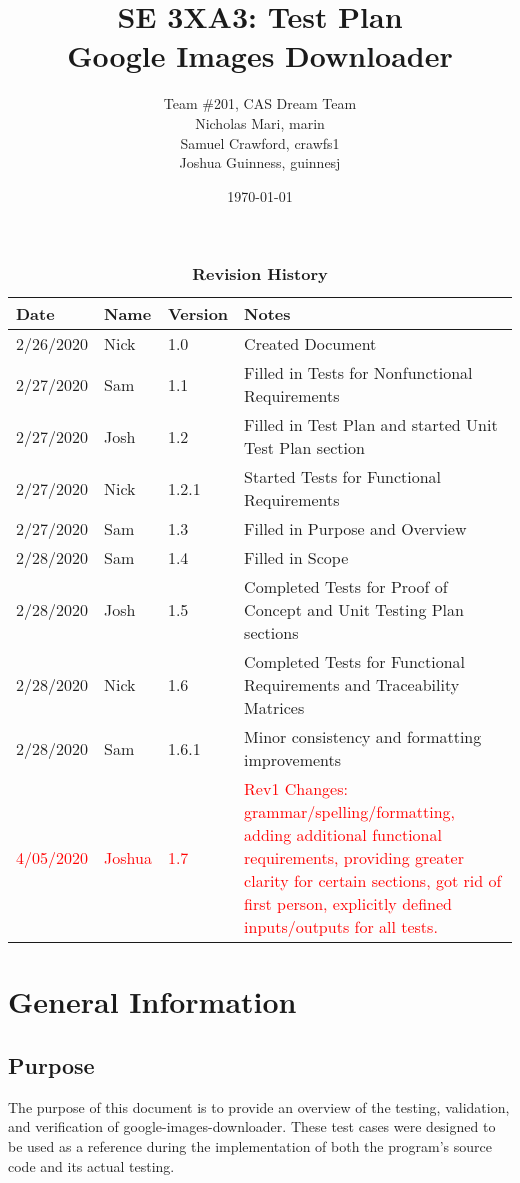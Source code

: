 \documentclass[12pt, titlepage]{article}
\title{SE 3XA3: Test Plan\\Google Images Downloader}
\author{Team \#201, CAS Dream Team
		\\ Nicholas Mari, marin
		\\ Samuel Crawford, crawfs1
		\\ Joshua Guinness, guinnesj
}
\date{\today}
\begin{document}
\maketitle

\tableofcontents
\listoftables

\begin{table}[!b]
\begin{tabularx}{\textwidth}{lllp{7.5cm}}
\toprule {\bf Date} & {\bf Name} & {\bf Version} & {\bf Notes}\\
\midrule
2/26/2020 & Nick & 1.0 & Created Document\\
2/27/2020 & Sam & 1.1 & Filled in Tests for Nonfunctional Requirements\\
2/27/2020 & Josh & 1.2 & Filled in Test Plan and started Unit Test Plan section\\
2/27/2020 & Nick & 1.2.1 & Started Tests for Functional Requirements\\
2/27/2020 & Sam & 1.3 & Filled in Purpose and Overview\\
2/28/2020 & Sam & 1.4 & Filled in Scope\\
2/28/2020 & Josh & 1.5 & Completed Tests for Proof of Concept and Unit Testing Plan sections\\
2/28/2020 & Nick & 1.6 & Completed Tests for Functional Requirements and Traceability Matrices\\
2/28/2020 & Sam & 1.6.1 & Minor consistency and formatting improvements\\
\textcolor{red}{4/05/2020} & \textcolor{red}{Joshua} & \textcolor{red}{1.7} & \textcolor{red}{Rev1 Changes: 
grammar/spelling/formatting, adding additional functional requirements, providing greater clarity for certain sections, 
got rid of first person, explicitly defined inputs/outputs for all tests.}\\
\bottomrule
\end{tabularx}
\caption{\bf Revision History}
\end{table}

\newpage


\section{General Information}

\subsection{Purpose}
The purpose of this document is to provide an overview of the testing, validation, and verification of google-images-downloader. These test cases were designed to be used as a reference during the implementation of both the program's source code and its actual testing.
\end{document}
